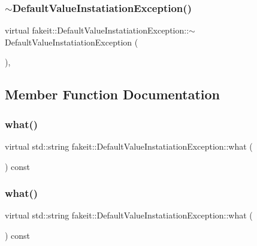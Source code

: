 \subsubsection{\texorpdfstring{$\sim$DefaultValueInstatiationException()}{~DefaultValueInstatiationException()}\hspace{0.1cm}{\footnotesize\ttfamily [9/9]}}
{\footnotesize\ttfamily virtual fakeit\+::\+Default\+Value\+Instatiation\+Exception\+::$\sim$\+Default\+Value\+Instatiation\+Exception (\begin{DoxyParamCaption}{ }\end{DoxyParamCaption})\hspace{0.3cm}{\ttfamily [virtual]}, {\ttfamily [default]}}



\subsection{Member Function Documentation}
\mbox{\label{structfakeit_1_1DefaultValueInstatiationException_a64d51af8601b672a5300c38a91b0b44d}} 
\subsubsection{\texorpdfstring{what()}{what()}\hspace{0.1cm}{\footnotesize\ttfamily [1/9]}}
{\footnotesize\ttfamily virtual std\+::string fakeit\+::\+Default\+Value\+Instatiation\+Exception\+::what (\begin{DoxyParamCaption}{ }\end{DoxyParamCaption}) const\hspace{0.3cm}{\ttfamily [pure virtual]}}

\mbox{\label{structfakeit_1_1DefaultValueInstatiationException_a64d51af8601b672a5300c38a91b0b44d}} 
\subsubsection{\texorpdfstring{what()}{what()}\hspace{0.1cm}{\footnotesize\ttfamily [2/9]}}
{\footnotesize\ttfamily virtual std\+::string fakeit\+::\+Default\+Value\+Instatiation\+Exception\+::what (\begin{DoxyParamCaption}{ }\end{DoxyParamCaption}) const\hspace{0.3cm}{\ttfamily [pure virtual]}}

